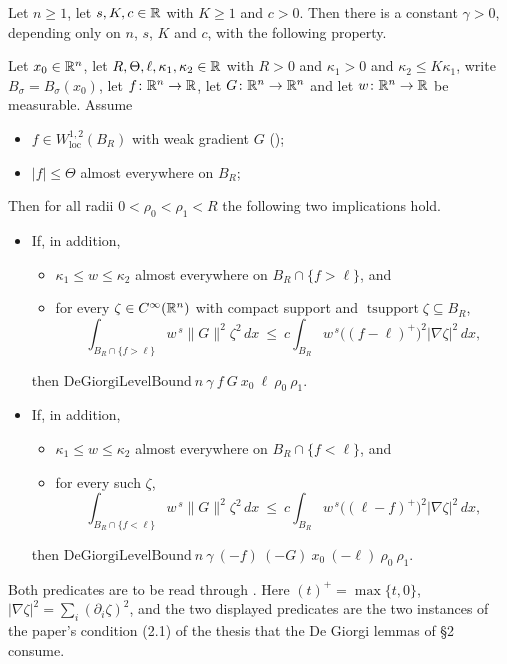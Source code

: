 \begin{lemma}
Let $n\ge1$, let $s,K,c\in\mathbb{R}$ with $K\ge1$ and $c>0$.  Then there is a constant
$\gamma>0$, depending only on $n$, $s$, $K$ and $c$, with the following
property.

Let $x_0\in\mathbb{R}^n$, let $R,\Theta,\ell,\kappa_1,\kappa_2\in\mathbb{R}$ with $R>0$ and
$\kappa_1>0$ and $\kappa_2\le K\kappa_1$, write $B_\sigma=B_\sigma(x_0)$, let
$f\colon\mathbb{R}^n\to\mathbb{R}$, let $G\colon\mathbb{R}^n\to\mathbb{R}^n$ and let $w\colon\mathbb{R}^n\to\mathbb{R}$ be
measurable.  Assume
\begin{itemize}
\item[\textup{(H1)}] $f\in W^{1,2}_{\mathrm{loc}}(B_R)$ with weak gradient $G$
  ();
\item[\textup{(H2)}] $|f|\le\Theta$ almost everywhere on $B_R$;
\end{itemize}
Then for all radii $0<\rho_0<\rho_1<R$ the following two implications hold.
\begin{itemize}
\item[\textup{($+$)}] If, in addition,
  \begin{itemize}
  \item[\textup{(H3$^+$)}] $\kappa_1\le w\le\kappa_2$ almost everywhere on
    $B_R\cap\{f>\ell\}$, and
  \item[\textup{(H4$^+$)}] for every $\zeta\in C^\infty(\mathbb{R}^n)$ with compact
    support and $\operatorname{tsupport}\zeta\subseteq B_R$,
    \[
    \int_{B_R\cap\{f>\ell\}}w^{\,s}\|G\|^2\zeta^2\,dx
    \ \le\ c\int_{B_R}w^{\,s}\bigl((f-\ell)^+\bigr)^2|\nabla\zeta|^2\,dx ,
    \]
  \end{itemize}
  then
  $\mathrm{DeGiorgiLevelBound}\ n\ \gamma\ f\ G\ x_0\ \ell\ \rho_0\ \rho_1$.
\item[\textup{($-$)}] If, in addition,
  \begin{itemize}
  \item[\textup{(H3$^-$)}] $\kappa_1\le w\le\kappa_2$ almost everywhere on
    $B_R\cap\{f<\ell\}$, and
  \item[\textup{(H4$^-$)}] for every such $\zeta$,
    \[
    \int_{B_R\cap\{f<\ell\}}w^{\,s}\|G\|^2\zeta^2\,dx
    \ \le\ c\int_{B_R}w^{\,s}\bigl((\ell-f)^+\bigr)^2|\nabla\zeta|^2\,dx ,
    \]
  \end{itemize}
  then
  $\mathrm{DeGiorgiLevelBound}\ n\ \gamma\ (-f)\ (-G)\ x_0\ (-\ell)\ \rho_0\
  \rho_1$.
\end{itemize}
Both predicates are to be read through .  Here
$(t)^+=\max\{t,0\}$,
$|\nabla\zeta|^2=\sum_i(\partial_i\zeta)^2$, and the two displayed predicates
are the two instances of the paper's condition (2.1) of the thesis that the De Giorgi
lemmas of \S2 consume.


\end{lemma}
